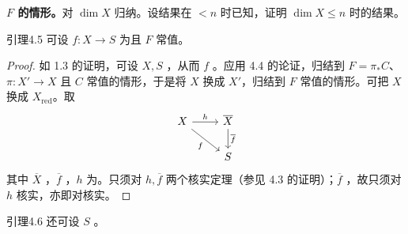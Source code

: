 \textbf{$F$ 的情形。}对 $\dim X$ 归纳。设结果在 $<n$ 时已知，证明 $\dim X\leq n$ 时的结果。
\begin{SGAresult}{引理}{4.5}
可设 $f:X\to S$ 为且 $F$ 常值。
\end{SGAresult}
\begin{proof}
如 1.3 的证明，可设 $X,S$ ，从而 $f$ 。应用 4.4 的论证，归结到 $F=\pi_*C$、$\pi:X'\to X$ 且 $C$ 常值的情形，于是将 $X$ 换成 $X'$，归结到 $F$ 常值的情形。可把 $X$ 换成 $X_{\mathrm{red}}$。取
\[
\begin{tikzcd}
X\arrow[r,"h"]\arrow[dr,"f"']&\overline X\arrow[d,"\overline f"]\\&S
\end{tikzcd}
\]
其中 $\overline X$ ，$\overline f$ ，$h$ 为。只须对 $h,\overline f$ 两个核实定理（参见 4.3 的证明）；$\overline f$ ，故只须对 $h$ 核实，亦即对核实。
\end{proof}
\begin{SGAresult}{引理}{4.6}
还可设 $S$ 。
\end{SGAresult}

